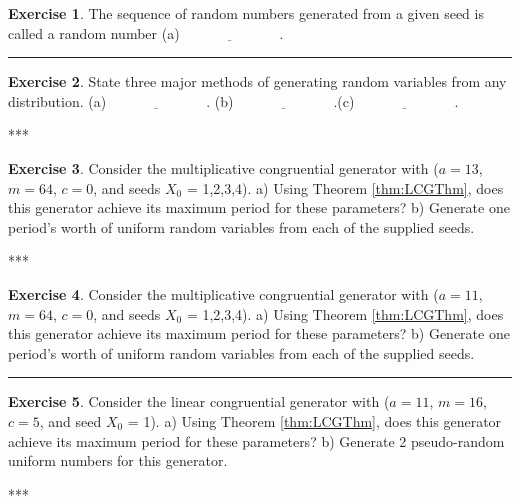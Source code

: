\documentclass[
]{book}
\theoremstyle{definition}
\theoremstyle{definition}
\theoremstyle{definition}
\newtheorem{exercise}{Exercise}[chapter]
\theoremstyle{definition}
\theoremstyle{remark}
\begin{document}
\begin{exercise}
\protect\hypertarget{exr:AppRNRVP1}{}{\label{exr:AppRNRVP1} }The sequence of random numbers generated from a given seed is called a
random number (a)\(\underline{\hspace{3cm}}\).
\end{exercise}

\begin{center}\rule{0.5\linewidth}{0.5pt}\end{center}

\begin{exercise}
\protect\hypertarget{exr:AppRNRVP2}{}{\label{exr:AppRNRVP2} }State three major methods of generating random variables from any
distribution. (a)\(\underline{\hspace{3cm}}\).
(b)\(\underline{\hspace{3cm}}\).(c)\(\underline{\hspace{3cm}}\).
\end{exercise}
***

\begin{exercise}
\protect\hypertarget{exr:AppRNRVP3}{}{\label{exr:AppRNRVP3} }Consider the multiplicative congruential generator with (\(a = 13\), \(m = 64\), \(c = 0\), and
seeds \(X_0\) = 1,2,3,4). a) Using Theorem \ref{thm:LCGThm}, does this generator achieve its maximum period for these parameters? b) Generate one period's worth of uniform random variables from each of the supplied seeds.
\end{exercise}
***

\begin{exercise}
\protect\hypertarget{exr:AppRNRVP4}{}{\label{exr:AppRNRVP4} }Consider the multiplicative congruential generator with (\(a = 11\), \(m = 64\), \(c = 0\), and
seeds \(X_0\) = 1,2,3,4). a) Using Theorem \ref{thm:LCGThm}, does this generator achieve its maximum period for these parameters? b) Generate one period's worth of uniform random variables from each of the supplied seeds.
\end{exercise}

\begin{center}\rule{0.5\linewidth}{0.5pt}\end{center}

\begin{exercise}
\protect\hypertarget{exr:AppRNRVP5}{}{\label{exr:AppRNRVP5} }Consider the linear congruential generator with (\(a = 11\), \(m = 16\), \(c = 5\), and
seed \(X_0\) = 1). a) Using Theorem \ref{thm:LCGThm}, does this generator achieve its maximum period for these parameters? b) Generate 2 pseudo-random uniform numbers for this generator.
\end{exercise}
***
\end{document}

